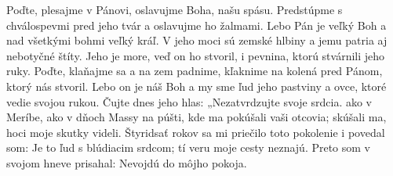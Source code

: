 Poďte, plesajme v Pánovi,
oslavujme Boha, našu spásu.
\versseparator
Predstúpme s chválospevmi pred jeho tvár
a oslavujme ho žalmami.
\versseparator
Lebo Pán je veľký Boh
a nad všetkými bohmi veľký kráľ.
\versseparator
V jeho moci sú zemské hlbiny
a jemu patria aj nebotyčné štíty.
\versseparator
Jeho je more, veď on ho stvoril,
i pevnina, ktorú stvárnili jeho ruky.
\versseparator
Poďte, klaňajme sa a na zem padnime,
kľaknime na kolená pred Pánom, ktorý nás stvoril.
\versseparator
Lebo on je náš Boh
a my sme ľud jeho pastviny a ovce, ktoré vedie svojou rukou.
\versseparator
Čujte dnes jeho hlas:
„Nezatvrdzujte svoje srdcia.
\versseparator
ako v Meríbe, ako v dňoch Massy na púšti,
kde ma pokúšali vaši otcovia;
skúšali ma, hoci moje skutky videli.
\versseparator
Štyridsať rokov sa mi priečilo toto pokolenie
i povedal som: Je to ľud s blúdiacim srdcom;
tí veru moje cesty neznajú.
\versseparator
Preto som v svojom hneve prisahal:
Nevojdú do môjho pokoja.
